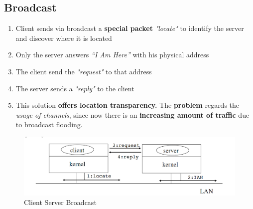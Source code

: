 \subsection{Broadcast}
\begin{enumerate}
    \item Client sends via broadcast a \textbf{special packet} \textit{"locate"} to identify the server and discover where it is located
    \item Only the server answers \textit{“I Am Here”} with his physical address
    \item The client send the \textit{"request"} to that address
    \item The server sends a \textit{"reply"} to the client
    \item This solution \textbf{offers location transparency.} The \textbf{problem} regards the \textit{usage of channels}, since now there is an \textbf{increasing amount of traffic} due to broadcast flooding.
\end{enumerate}
\begin{figure}[!h]
            \centering
            \includegraphics[width=.7\linewidth]{images/clientServerCommunication/clientServerBroadcast.png}
            \caption{Client Server Broadcast}
    \end{figure}

